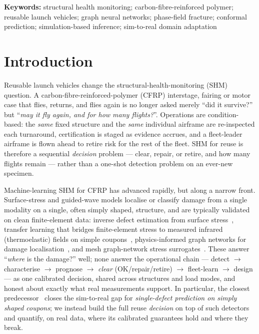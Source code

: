 \documentclass[11pt]{article}
\begin{document}
\noindent\textbf{Keywords:} structural health monitoring; carbon-fibre-reinforced
polymer; reusable launch vehicles; graph neural networks; phase-field fracture;
conformal prediction; simulation-based inference; sim-to-real domain adaptation

\section{Introduction}
Reusable launch vehicles change the structural-health-monitoring (SHM) question.
A carbon-fibre-reinforced-polymer (CFRP) interstage, fairing or motor case that
flies, returns, and flies again is no longer asked merely ``did it survive?'' but
``\emph{may it fly again, and for how many flights?}''. Operations are
condition-based: the \emph{same} fixed structure and the \emph{same} individual
airframe are re-inspected each turnaround, certification is staged as evidence
accrues, and a fleet-leader airframe is flown ahead to retire risk for the rest of
the fleet. SHM for reuse is therefore a sequential \emph{decision} problem ---
clear, repair, or retire, and how many flights remain --- rather than a one-shot
detection problem on an ever-new specimen.

Machine-learning SHM for CFRP has advanced rapidly, but along a narrow front.
Surface-stress and guided-wave models localise or classify damage from a single
modality on a single, often simply shaped, structure, and are typically validated
on clean finite-element data: inverse defect estimation from surface
stress~\cite{kojima2022inverse}, transfer learning that bridges finite-element
stress to measured infrared (thermoelastic) fields on simple
coupons~\cite{kojima2024transfer}, physics-informed graph networks for damage
localisation~\cite{authors2026interpretableb}, and mesh graph-network stress
surrogates~\cite{pfaff2021learning,nishioka2025development}. These answer
``\emph{where} is the damage?'' well; none answer the operational chain ---
detect $\to$ characterise $\to$ prognose $\to$ \emph{clear} (OK/repair/retire)
$\to$ fleet-learn $\to$ design --- as one calibrated decision, shared across
structures and load modes, and honest about exactly what real measurements
support. In particular, the closest predecessor~\cite{kojima2024transfer} closes
the sim-to-real gap for \emph{single-defect prediction on simply shaped coupons};
we instead build the full reuse \emph{decision} on top of such detectors and
quantify, on real data, where its calibrated guarantees hold and where they break.
\end{document}
